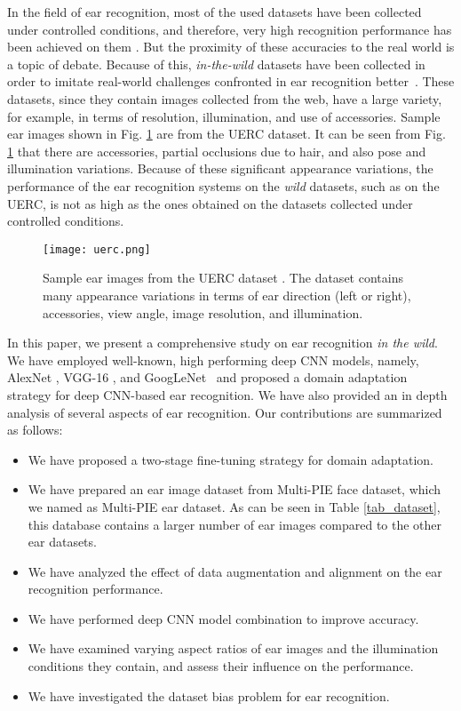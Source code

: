 \documentclass[11pt,journal,compsoc]{IEEEtran}
\begin{document}
In the field of ear recognition, most of the used datasets have been collected under controlled conditions, and therefore, very high recognition performance has been achieved on them \cite{Emersic_2017_a}. But the proximity of these accuracies to the real world is a topic of debate. Because of this, \textit{in-the-wild} datasets have been collected in order to imitate real-world challenges confronted in ear recognition better~\cite{Emersic_2017_a}. These datasets, since they contain images collected from the web, have a large variety, for example, in terms of resolution, illumination, and use of accessories. Sample ear images shown in Fig. \ref{Fig1} are from the UERC dataset. It can be seen from Fig. \ref{Fig1} that there are accessories, partial occlusions due to hair, and also pose and illumination variations. Because of these significant appearance variations, the performance of the ear recognition systems on the \textit{wild} datasets, such as on the UERC, is not as high as the ones obtained on the datasets collected under controlled conditions.  

\begin{figure}[t]
	\centering
	\texttt{[image: uerc.png]}
	\caption{Sample ear images from the UERC dataset \cite{Emersic_2017_b}. The dataset contains many appearance variations in terms of ear direction (left or right), accessories, view angle, image resolution, and illumination.}
	\label{Fig1}
\end{figure}

In this paper, we present a comprehensive study on ear recognition \textit{in the wild}. We have employed well-known, high performing deep CNN models, namely, AlexNet \cite{Krizhevsky_2012}, VGG-16 \cite{Simonyan_2014}, and GoogLeNet~\cite{Szegedy_2015} and proposed a domain adaptation strategy for deep CNN-based ear recognition. We have also provided an in depth analysis of several aspects of ear recognition. Our contributions are summarized as follows: 
\begin{itemize}
\item We have proposed a two-stage fine-tuning strategy for domain adaptation. 
\item We have prepared an ear image dataset from Multi-PIE face dataset, which we named as Multi-PIE ear dataset. As can be seen in Table \ref{tab_dataset}, this database contains a larger number of ear images compared to the other ear datasets.
\item We have analyzed the effect of data augmentation and alignment on the ear recognition performance.
\item We have performed deep CNN model combination to improve accuracy.
\item We have examined varying aspect ratios of ear images and the illumination conditions they contain, and assess their influence on the performance.
\item We have investigated the dataset bias problem for ear recognition.

\end{itemize}
\end{document}

